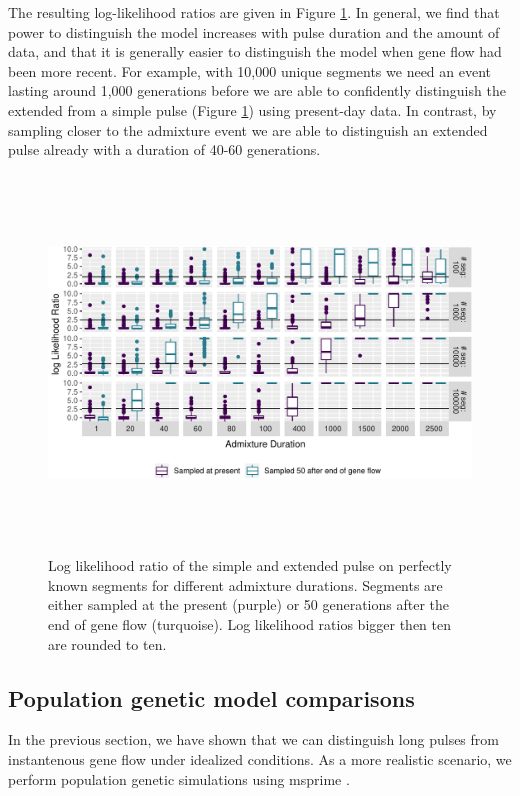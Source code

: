 \documentclass[11pt]{article}
\begin{document}

The resulting log-likelihood ratios are given in Figure \ref{fig:fig1_1}. In general, we find that power to distinguish the model increases with pulse duration and the amount of data, and that it is generally easier to distinguish the model when gene flow had been more recent.  For example, with 10,000 unique segments we need an event lasting around 1,000 generations before we are able to confidently distinguish the extended from a simple pulse (Figure \ref{fig:fig1_1}) using present-day data. In contrast, by sampling closer to the admixture event we are able to distinguish an extended pulse already with a duration of 40-60 generations.

\begin{figure}
\centering
\includegraphics[width=16cm,height=10cm,keepaspectratio]{ATE_Revisions_files/figure-latex/figR1-1.pdf}
\caption{\label{fig:fig1_1} Log likelihood ratio of the simple and extended pulse on perfectly known segments for different admixture durations. Segments are either sampled at the present (purple) or 50 generations after the end of gene flow (turquoise). Log likelihood ratios bigger then ten are rounded to ten.}
\end{figure}


\subsection{Population genetic model comparisons}\label{Model comparison}
In the previous section, we have shown that we can distinguish long pulses from instantenous gene flow under idealized conditions. As a more realistic scenario, we perform population genetic simulations using  msprime \citep{kelleher_efficient_2016}. 
\end{document}
